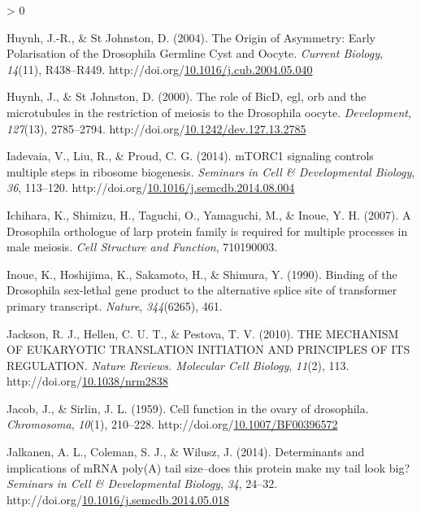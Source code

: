 \documentclass[12pt,oneside]{reedthesis}
\newlength{\cslhangindent}
\newenvironment{CSLReferences}[2] %
 {%
  \setlength{\parindent}{0pt}
  \ifodd #1 \everypar{\setlength{\hangindent}{\cslhangindent}}\ignorespaces\fi
  \ifnum #2 > 0
  \setlength{\parskip}{#2\baselineskip}
  \fi
 }%
 {}
\begin{document}
\begin{CSLReferences}{1}{0}
\leavevmode\hypertarget{ref-huynhOriginAsymmetryEarly2004}{}%
Huynh, J.-R., \& St Johnston, D. (2004). The {Origin} of {Asymmetry}: {Early Polarisation} of the {Drosophila Germline Cyst} and {Oocyte}. \emph{Current Biology}, \emph{14}(11), R438--R449. http://doi.org/\href{https://doi.org/10.1016/j.cub.2004.05.040}{10.1016/j.cub.2004.05.040}

\leavevmode\hypertarget{ref-huynhRoleBicDEgl2000}{}%
Huynh, J., \& St Johnston, D. (2000). The role of {BicD}, egl, orb and the microtubules in the restriction of meiosis to the {Drosophila} oocyte. \emph{Development}, \emph{127}(13), 2785--2794. http://doi.org/\href{https://doi.org/10.1242/dev.127.13.2785}{10.1242/dev.127.13.2785}

\leavevmode\hypertarget{ref-iadevaiaMTORC1SignalingControls2014}{}%
Iadevaia, V., Liu, R., \& Proud, C. G. (2014). {mTORC1} signaling controls multiple steps in ribosome biogenesis. \emph{Seminars in Cell \& Developmental Biology}, \emph{36}, 113--120. http://doi.org/\href{https://doi.org/10.1016/j.semcdb.2014.08.004}{10.1016/j.semcdb.2014.08.004}

\leavevmode\hypertarget{ref-Ichihara2007a}{}%
Ichihara, K., Shimizu, H., Taguchi, O., Yamaguchi, M., \& Inoue, Y. H. (2007). A {Drosophila} orthologue of larp protein family is required for multiple processes in male meiosis. \emph{Cell Structure and Function}, 710190003.

\leavevmode\hypertarget{ref-Inoue1990}{}%
Inoue, K., Hoshijima, K., Sakamoto, H., \& Shimura, Y. (1990). Binding of the {Drosophila} sex-lethal gene product to the alternative splice site of transformer primary transcript. \emph{Nature}, \emph{344}(6265), 461.

\leavevmode\hypertarget{ref-jacksonMECHANISMEUKARYOTICTRANSLATION2010}{}%
Jackson, R. J., Hellen, C. U. T., \& Pestova, T. V. (2010). {THE MECHANISM OF EUKARYOTIC TRANSLATION INITIATION AND PRINCIPLES OF ITS REGULATION}. \emph{Nature Reviews. Molecular Cell Biology}, \emph{11}(2), 113. http://doi.org/\href{https://doi.org/10.1038/nrm2838}{10.1038/nrm2838}

\leavevmode\hypertarget{ref-jacobCellFunctionOvary1959}{}%
Jacob, J., \& Sirlin, J. L. (1959). Cell function in the ovary of drosophila. \emph{Chromosoma}, \emph{10}(1), 210--228. http://doi.org/\href{https://doi.org/10.1007/BF00396572}{10.1007/BF00396572}

\leavevmode\hypertarget{ref-Jalkanen2014h}{}%
Jalkanen, A. L., Coleman, S. J., \& Wilusz, J. (2014). Determinants and implications of {mRNA} poly({A}) tail size--does this protein make my tail look big? \emph{Seminars in Cell \& Developmental Biology}, \emph{34}, 24--32. http://doi.org/\href{https://doi.org/10.1016/j.semcdb.2014.05.018}{10.1016/j.semcdb.2014.05.018}


\end{CSLReferences}
\end{document}
